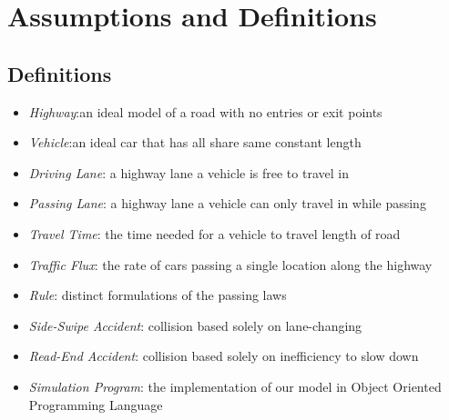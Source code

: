 \documentclass{amsart}
\begin{document}
\section{\bfseries{Assumptions and Definitions}}
	\subsection{Definitions}
		\begin{itemize}
  			\item \textit{Highway}:an ideal model of a road with no entries or exit points
			\item \textit{Vehicle}:an ideal car that has all share same constant length 
			\item \textit{Driving Lane}: a highway lane a vehicle is free to travel in
  			\item \textit{Passing Lane}: a highway lane a vehicle can only travel in while passing
			\item \textit{Travel Time}: the time needed for a vehicle to travel length of road
			\item \textit{Traffic Flux}: the rate of cars passing a single location along the highway
			\item \textit{Rule}: distinct formulations of the passing laws 
			\item \textit{Side-Swipe Accident}: collision based solely on lane-changing
			\item \textit{Read-End Accident}: collision based solely on inefficiency to slow down
			\item \textit{Simulation Program}: the implementation of our model in  Object Oriented Programming Language
			
		\end{itemize}
	
\end{document}
